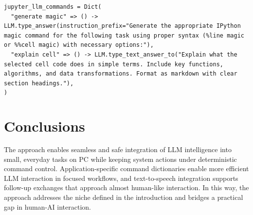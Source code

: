 \documentclass{juliacon}
\begin{document}
\begin{lstlisting}[caption={Application-specific Jupyter commands built from predefined LLM commands. In this example, \texttt{LLM.type\_answer} answers an uttered instruction directly, whereas \texttt{LLM.type\_text\_answer\_to} answers with respect to selected text or clipboard content; the first command types the appropriate IPython magic for a spoken task and the second types a markdown explanation of the selected cell, demonstrating concise application-specific LLM interaction.},label={code:jupyter}]
jupyter_llm_commands = Dict(
  "generate magic" => () -> LLM.type_answer(instruction_prefix="Generate the appropriate IPython magic command for the following task using proper syntax (%line magic or %%cell magic) with necessary options:"),
  "explain cell" => () -> LLM.type_text_answer_to("Explain what the selected cell code does in simple terms. Include key functions, algorithms, and data transformations. Format as markdown with clear section headings."),
)
\end{lstlisting}

\section{Conclusions}

The approach enables seamless and safe integration of LLM intelligence into small, everyday tasks on PC while keeping system actions under deterministic command control. Application-specific command dictionaries enable more efficient LLM interaction in focused workflows, and text-to-speech integration supports follow-up exchanges that approach almost human-like interaction. In this way, the approach addresses the niche defined in the introduction and bridges a practical gap in human-AI interaction.


\end{document}
